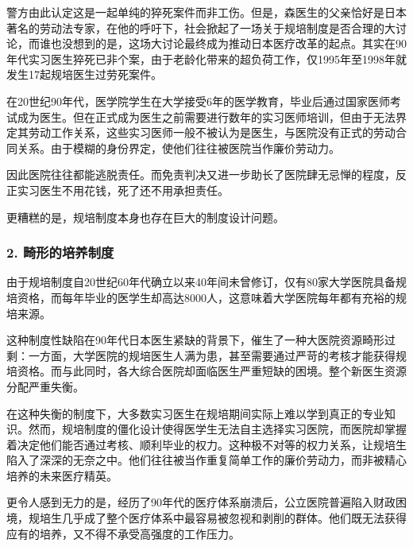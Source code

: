 {\fangsong 警方由此认定这是一起单纯的猝死案件而非工伤。但是，森医生的父亲恰好是日本著名的劳动法专家，在他的呼吁下，社会掀起了一场关于规培制度是否合理的大讨论，而谁也没想到的是，这场大讨论最终成为推动日本医疗改革的起点。其实在90年代实习医生猝死已非个案，由于老龄化带来的超负荷工作，仅1995年至1998年就发生17起规培医生过劳死案件。\par}

{\fangsong 在20世纪90年代，医学院学生在大学接受6年的医学教育，毕业后通过国家医师考试成为医生。但在正式成为医生之前需要进行数年的实习医师培训，但由于无法界定其劳动工作关系，这些实习医师一般不被认为是医生，与医院没有正式的劳动合同关系。由于模糊的身份界定，使他们往往被医院当作廉价劳动力。\par}

{\fangsong 因此医院往往都能逃脱责任。而免责判决又进一步助长了医院肆无忌惮的程度，反正实习医生不用花钱，死了还不用承担责任。\par}

{\fangsong 更糟糕的是，规培制度本身也存在巨大的制度设计问题。\par}

\subsubsection{2. 畸形的培养制度}

{\fangsong 由于规培制度自20世纪60年代确立以来40年间未曾修订，仅有80家大学医院具备规培资格，而每年毕业的医学生却高达8000人，这意味着大学医院每年都有充裕的规培来源。\par}

{\fangsong 这种制度性缺陷在90年代日本医生紧缺的背景下，催生了一种大医院资源畸形过剩：一方面，大学医院的规培医生人满为患，甚至需要通过严苛的考核才能获得规培资格。而与此同时，各大综合医院却面临医生严重短缺的困境。整个新医生资源分配严重失衡。\par}

{\fangsong 在这种失衡的制度下，大多数实习医生在规培期间实际上难以学到真正的专业知识。然而，规培制度的僵化设计使得医学生无法自主选择实习医院，而医院却掌握着决定他们能否通过考核、顺利毕业的权力。这种极不对等的权力关系，让规培生陷入了深深的无奈之中。他们往往被当作重复简单工作的廉价劳动力，而非被精心培养的未来医疗精英。\par}

{\fangsong 更令人感到无力的是，经历了90年代的医疗体系崩溃后，公立医院普遍陷入财政困境，规培生几乎成了整个医疗体系中最容易被忽视和剥削的群体。他们既无法获得应有的培养，又不得不承受高强度的工作压力。\par}


